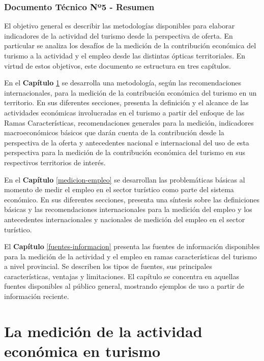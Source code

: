 \documentclass[
  openany]{book}
\begin{document}
\hypertarget{documento-tuxe9cnico-nuxba5---resumen}{%
\subsection*{Documento Técnico Nº5 - Resumen}\label{documento-tuxe9cnico-nuxba5---resumen}}

El objetivo general es describir las metodologías disponibles para elaborar indicadores de la actividad del turismo desde la perspectiva de oferta. En particular se analiza los desafíos de la medición de la contribución económica del turismo a la actividad y el empleo desde las distintas ópticas territoriales. En virtud de estos objetivos, este documento se estructura en tres capítulos.

En el \textbf{Capítulo} \ref{medicion-actividad} se desarrolla una metodología, según las recomendaciones internacionales, para la medición de la contribución económica del turismo en un territorio. En sus diferentes secciones, presenta la definición y el alcance de las actividades económicas involucradas en el turismo a partir del enfoque de las Ramas Características, recomendaciones generales para la medición, indicadores macroeconómicos básicos que darán cuenta de la contribución desde la perspectiva de la oferta y antecedentes nacional e internacional del uso de esta perspectiva para la medición de la contribución económica del turismo en sus respectivos territorios de interés.

En el \textbf{Capítulo} \ref{medicion-empleo} se desarrollan las problemáticas básicas al momento de medir el empleo en el sector turístico como parte del sistema económico. En sus diferentes secciones, presenta una síntesis sobre las definiciones básicas y las recomendaciones internacionales para la medición del empleo y los antecedentes internacionales y nacionales de medición del empleo en el sector turístico.

El \textbf{Capítulo} \ref{fuentes-informacion} presenta las fuentes de información disponibles para la medición de la actividad y el empleo en ramas características del turismo a nivel provincial. Se describen los tipos de fuentes, sus principales características, ventajas y limitaciones. El capítulo se concentra en aquellas fuentes disponibles al público general, mostrando ejemplos de uso a partir de información reciente.

\hypertarget{medicion-actividad}{%
\chapter{\texorpdfstring{\textbf{La medición de la actividad económica en turismo}}{La medición de la actividad económica en turismo}}\label{medicion-actividad}}
\end{document}
